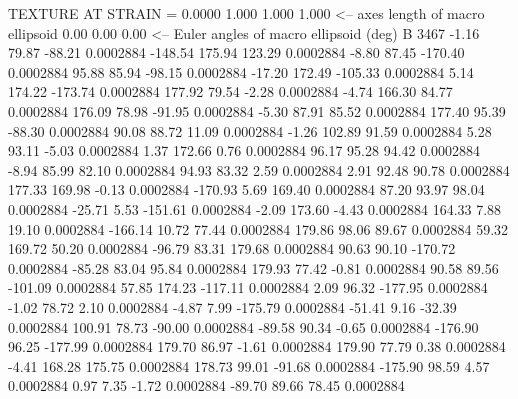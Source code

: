 TEXTURE AT STRAIN =    0.0000
   1.000   1.000   1.000  <-- axes length of macro ellipsoid
    0.00    0.00    0.00  <-- Euler angles of macro ellipsoid (deg)
B      3467
       -1.16       79.87      -88.21     0.0002884
     -148.54      175.94      123.29     0.0002884
       -8.80       87.45     -170.40     0.0002884
       95.88       85.94      -98.15     0.0002884
      -17.20      172.49     -105.33     0.0002884
        5.14      174.22     -173.74     0.0002884
      177.92       79.54       -2.28     0.0002884
       -4.74      166.30       84.77     0.0002884
      176.09       78.98      -91.95     0.0002884
       -5.30       87.91       85.52     0.0002884
      177.40       95.39      -88.30     0.0002884
       90.08       88.72       11.09     0.0002884
       -1.26      102.89       91.59     0.0002884
        5.28       93.11       -5.03     0.0002884
        1.37      172.66        0.76     0.0002884
       96.17       95.28       94.42     0.0002884
       -8.94       85.99       82.10     0.0002884
       94.93       83.32        2.59     0.0002884
        2.91       92.48       90.78     0.0002884
      177.33      169.98       -0.13     0.0002884
     -170.93        5.69      169.40     0.0002884
       87.20       93.97       98.04     0.0002884
      -25.71        5.53     -151.61     0.0002884
       -2.09      173.60       -4.43     0.0002884
      164.33        7.88       19.10     0.0002884
     -166.14       10.72       77.44     0.0002884
      179.86       98.06       89.67     0.0002884
       59.32      169.72       50.20     0.0002884
      -96.79       83.31      179.68     0.0002884
       90.63       90.10     -170.72     0.0002884
      -85.28       83.04       95.84     0.0002884
      179.93       77.42       -0.81     0.0002884
       90.58       89.56     -101.09     0.0002884
       57.85      174.23     -117.11     0.0002884
        2.09       96.32     -177.95     0.0002884
       -1.02       78.72        2.10     0.0002884
       -4.87        7.99     -175.79     0.0002884
      -51.41        9.16      -32.39     0.0002884
      100.91       78.73      -90.00     0.0002884
      -89.58       90.34       -0.65     0.0002884
     -176.90       96.25     -177.99     0.0002884
      179.70       86.97       -1.61     0.0002884
      179.90       77.79        0.38     0.0002884
       -4.41      168.28      175.75     0.0002884
      178.73       99.01      -91.68     0.0002884
     -175.90       98.59        4.57     0.0002884
        0.97        7.35       -1.72     0.0002884
      -89.70       89.66       78.45     0.0002884
